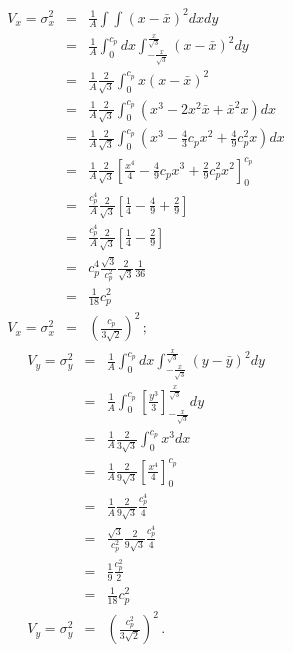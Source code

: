\begin{eqnarray}
  V_x = \sigma^2_x &=& \frac{1}{A} \int \int (x-\bar{x})^{2} dx dy   \\
                  &=& \frac{1}{A} \int_{0}^{c_p} dx 
                      \int_{-\frac{x}{\sqrt{3}}}^{\frac{x}{\sqrt{3}}}  
                      (x-\bar{x})^{2} dy                            \\
                  &=& \frac{1}{A} \frac{2}{\sqrt{3}} 
                      \int_{0}^{c_p} x (x-\bar{x})^{2}              \\
                  &=& \frac{1}{A} \frac{2}{\sqrt{3}} 
                      \int_{0}^{c_p}
                      ( x^{3}-2x^{2}\bar{x}+\bar{x}^{2}x ) dx           \\
                  &=& \frac{1}{A} \frac{2}{\sqrt{3}} 
                      \int_{0}^{c_p} ( x^{3}-\frac{4}{3}c_p x^{2}
                      + \frac{4}{9} c_p^{2} x ) dx                  \\
                  &=& \frac{1}{A} \frac{2}{\sqrt{3}} 
                      \left[ \frac{x^{4}}{4} - \frac{4}{9} c_p x^{3}
                      + \frac{2}{9} c_p^{2} x^{2}\right]_{0}^{c_p}      \\
                  &=& \frac{c_p^4}{A} \frac{2}{\sqrt{3}} 
                      \left[ \frac{1}{4}-\frac{4}{9}+\frac{2}{9} \right]  \\
                  &=& \frac{c_p^4}{A} \frac{2}{\sqrt{3}} 
                      \left[ \frac{1}{4}-\frac{2}{9} \right]  \\
                  &=& c_p^4 \frac{\sqrt{3}}{c_p^2} \frac{2}{\sqrt{3}} 
                           \frac{1}{36}  \\
                  &=& \frac{1}{18} c_p^{2} \\
  V_x = \sigma^2_x &=& \left( \frac{c_p}{3\sqrt{2}} \right)^2 \, ;
\end{eqnarray}
\begin{eqnarray}
  V_y = \sigma^2_y 
        &=& \frac{1}{A} \int_{0}^{c_p} dx
            \int_{-\frac{x}{\sqrt{3}}}^{\frac{x}{\sqrt{3}}}(y-\bar{y})^{2} dy \\
        &=& \frac{1}{A} \int_{0}^{c_p} \left[ \frac{y^{3}}{3} 
            \right]_{-\frac{x}{\sqrt{3}}}^{\frac{x}{\sqrt{3}}} dy            \\
        &=& \frac{1}{A} \frac{2}{3\sqrt{3}} 
            \int_{0}^{c_p} x^{3}dx \nonumber                        \\
        &=& \frac{1}{A} \frac{2}{9\sqrt{3}} 
            \left[ \frac{x^{4}}{4} \right]_{0}^{c_p}                \\
        &=& \frac{1}{A} \frac{2}{9\sqrt{3}} \frac{c_p^4}{4}      \\
        &=& \frac{\sqrt{3}}{c_p^2} \frac{2}{9\sqrt{3}} \frac{c_p^4}{4}  \\
        &=& \frac{1}{9} \frac{c_p^2}{2}  \\
        &=& \frac{1}{18} c_p^2  \\
  V_y = \sigma^2_y 
        &=& \left( \frac{c_p^{2}}{3\sqrt{2}} \right)^2 \, .
\end{eqnarray}
